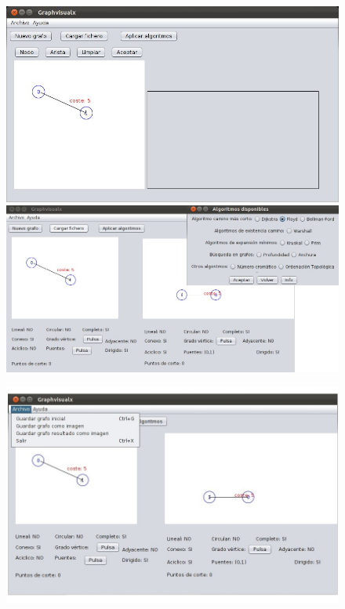 \begin{itemize}
\begin{figure}[H]
\begin{center}
\includegraphics[width=14cm]{./imagenes_documentacion/Graphvisualx_5_11_2011/captura_3.jpeg}
\includegraphics[width=14cm]{./imagenes_documentacion/Graphvisualx_5_11_2011/captura_4.jpeg}
\end{center}
\end{figure}
\newpage
\begin{figure}[H]
\begin{center}
\includegraphics[width=15cm]{./imagenes_documentacion/Graphvisualx_5_11_2011/captura_5.jpeg}
\end{center}
\end{figure}


\end{itemize}
